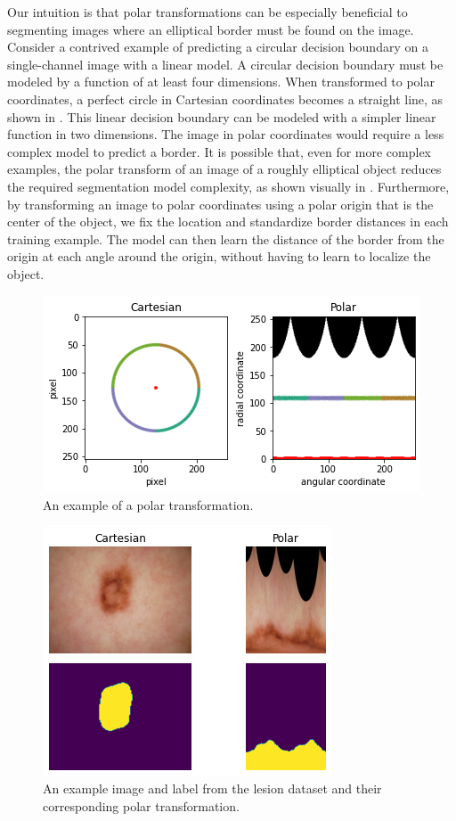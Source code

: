 Our intuition is that polar transformations can be especially beneficial to segmenting images where an 
elliptical border must be found on the image. Consider a contrived example of predicting a 
circular decision boundary on a single-channel image with a linear model. A circular decision boundary 
must be modeled by a function of at least four dimensions. When transformed to 
polar coordinates, a perfect circle in Cartesian coordinates becomes a straight line, as shown in 
. This linear decision boundary can be modeled with a simpler linear function 
in two dimensions. The image in polar coordinates would require a less complex model to predict a 
border. It is possible that, even for more complex examples, the polar transform of an image of a roughly 
elliptical object reduces the required segmentation model complexity, as shown visually in 
. Furthermore, by transforming an image to polar coordinates using a polar origin 
that is the center of the object, we fix the location and standardize border distances in each training 
example. The model can then learn the distance of the border from the origin at each angle around the 
origin, without having to learn to localize the object.

	\begin{figure}[h]
		\centering
		\includegraphics[width=0.6\linewidth]{images/4/polar-transform}
		\caption{An example of a polar transformation.}
		\label{fig:polar-coords}
	\end{figure}


	\begin{figure}[h]
		\centering
		\includegraphics[width=0.4\linewidth]{images/4/to_polar}
		\caption{An example image and label from the lesion dataset and their corresponding polar transformation.}
		\label{fig:polar-lesion}
	\end{figure}

